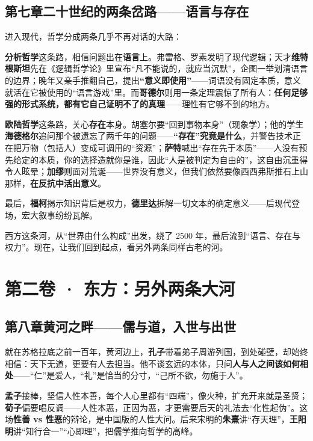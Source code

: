 \documentclass[12pt,a4paper,fontset=none]{ctexart}
\newcommand{\saying}[1]{{\notomed\color{accent}#1}}
\begin{document}
\subsection{第七章\quad 二十世纪的两条岔路——语言与存在}

进入现代，哲学分成两条几乎不再对话的大路：

\textbf{分析哲学}这条路，相信问题出在\textbf{语言}上。弗雷格、罗素发明了现代逻辑；天才\textbf{维特根斯坦}先在《逻辑哲学论》里宣布\saying{“凡不能说的，就应当沉默”}，企图一举划清语言的边界；晚年又亲手推翻自己，提出\textbf{“意义即使用”}——词语没有固定本质，意义就活在它被使用的“语言游戏”里。而\textbf{哥德尔}则用一条定理震惊了所有人：\textbf{任何足够强的形式系统，都有它自己证明不了的真理}——理性有它够不到的地方。

\textbf{欧陆哲学}这条路，关心\textbf{存在}本身。胡塞尔要“回到事物本身”（现象学）；他的学生\textbf{海德格尔}追问那个被遗忘了两千年的问题——\textbf{“存在”究竟是什么}，并警告技术正在把万物（包括人）变成可调用的“资源”；\textbf{萨特}喊出\saying{“存在先于本质”}——人没有预先给定的本质，你的选择造就你是谁，因此“人是被判定为自由的”，这自由沉重得令人眩晕；\textbf{加缪}则面对荒诞——世界没有意义，但我们依然要像西西弗斯推石上山那样，\textbf{在反抗中活出意义}。

最后，\textbf{福柯}揭示知识背后是权力，\textbf{德里达}拆解一切文本的确定意义——后现代登场，宏大叙事纷纷瓦解。

西方这条河，从“世界由什么构成”出发，绕了 2500 年，最后流到“语言、存在与权力”。现在，让我们回到起点，看另外两条同样古老的河。

\section{第二卷 · 东方：另外两条大河}

\subsection{第八章\quad 黄河之畔——儒与道，入世与出世}

就在苏格拉底之前一百年，黄河边上，\textbf{孔子}带着弟子周游列国，到处碰壁，却始终相信：天下无道，更要有人去担当。他不谈玄远的本体，只问\textbf{人与人之间该如何相处}——“仁”是爱人，“礼”是恰当的分寸，\saying{“己所不欲，勿施于人”}。

\textbf{孟子}接棒，坚信人性本善，每个人心里都有“四端”，像火种，扩充开来就是圣贤；\textbf{荀子}偏要唱反调——人性本恶，正因为恶，才更需要后天的礼法去“化性起伪”。这场\textbf{性善 vs 性恶}的辩论，是中国版的人性大问。后来宋明的\textbf{朱熹}讲“存天理”，\textbf{王阳明}讲\saying{“知行合一”}“心即理”，把儒学推向哲学的高峰。
\end{document}

